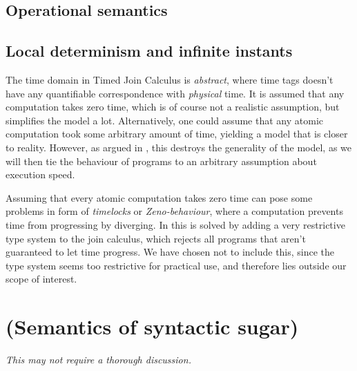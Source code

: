 \subsection{Operational semantics}


\subsection{Local determinism and infinite instants}

The time domain in Timed Join Calculus is \emph{abstract}, where time tags
doesn't have any quantifiable correspondence with \emph{physical} time. It is
assumed that any computation takes zero time, which is of course not a
realistic assumption, but simplifies the model a lot. Alternatively, one could
assume that any atomic computation took some arbitrary amount of time, yielding
a model that is closer to reality. However, as argued in
\cite{nicollin-overview}, this destroys the generality of the model, as we will
then tie the behaviour of programs to an arbitrary assumption about execution
speed.

Assuming that every atomic computation takes zero time can pose some problems
in form of \emph{timelocks} or \emph{Zeno-behaviour}, where a computation
prevents time from progressing by diverging. In \cite{timed-join} this is
solved by adding a very restrictive type system to the join calculus, which
rejects all programs that aren't guaranteed to let time progress. We have
chosen not to include this, since the type system seems too restrictive for
practical use, and therefore lies outside our scope of interest.


\section{(Semantics of syntactic sugar)}

\emph{This may not require a thorough discussion.}
